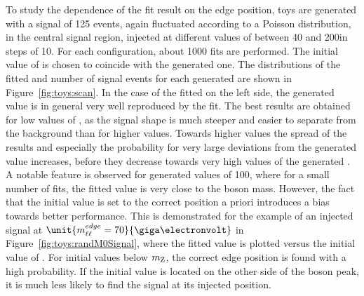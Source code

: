 To study the dependence of the fit result on the edge position, toys are generated with a signal of 125 events, again fluctuated according to a Poisson distribution, in the central signal region, injected at different values of \mlledge between 40 and 200\GeV in steps of 10\GeV. For each configuration, about 1000 fits are performed. The initial value of \mlledge is chosen to coincide with the generated one. The distributions of the fitted \mlledge and number of signal events for each generated \mlledge are shown in Figure~\ref{fig:toys:scan}. In the case of the fitted \mlledge on the left side, the generated value is in general very well reproduced by the fit. The best results are obtained for low values of \mlledge, as the signal shape is much steeper and easier to separate from the background than for higher values. Towards higher values the spread of the results and especially the probability for very large deviations from the generated value increases, before they decrease towards very high values of the generated \mlledge. A notable feature is observed for generated values of 100\GeV, where for a small number of fits, the fitted value is very close to the \Z boson mass. However, the fact that the initial value is set to the correct position a priori introduces a bias towards better performance. This is demonstrated for the example of an injected signal at $\unit{\mlledge = 70}{\giga\electronvolt}$ in Figure~\ref{fig:toys:randM0Signal}, where the fitted value is plotted versus the initial value of \mlledge. For initial values below $m_{\mathrm{Z}}$, the correct edge position is found with a high probability. If the initial value is located on the other side of the \Z boson peak, it is much less likely to find the signal at its injected position. 

